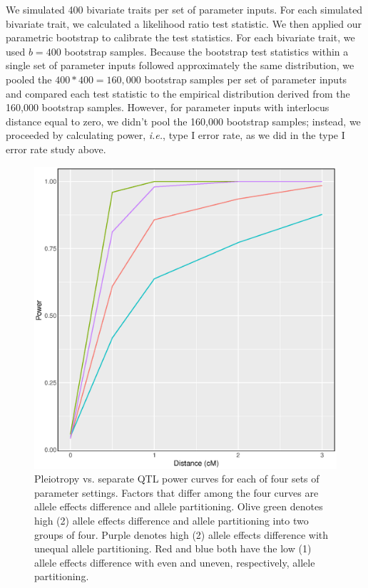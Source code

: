 \documentclass[12pt,twoside, lineno]{gsajnl}
\begin{document}
We simulated 400 bivariate traits per set of parameter inputs. For each simulated bivariate trait, we calculated a likelihood ratio test statistic. We then applied our parametric bootstrap to calibrate the test statistics. For each bivariate trait, we used $b = 400$ bootstrap samples. Because the bootstrap test statistics within a single set of parameter inputs followed approximately the same distribution, we pooled the $400 * 400 = 160,000$ bootstrap samples per set of parameter inputs and compared each test statistic to the empirical distribution derived from the 160,000 bootstrap samples. However, for parameter inputs with interlocus distance equal to zero, we didn't pool the 160,000 bootstrap samples; instead, we proceeded by calculating power, \textit{i.e.}, type I error rate, as we did in the type I error rate study above.

\begin{figure}
\includegraphics[width = \textwidth]{../R/power-curves.eps}
\caption{Pleiotropy vs. separate QTL power curves for each of four sets of parameter settings. Factors that differ among the four curves are allele effects difference and allele partitioning. Olive green denotes high (2) allele effects difference and allele partitioning into two groups of four. Purple denotes high (2) allele effects difference with unequal allele partitioning. Red and blue both have the low (1) allele effects difference with even and uneven, respectively, allele partitioning.}
\label{fig:power}
\end{figure}
\end{document}
